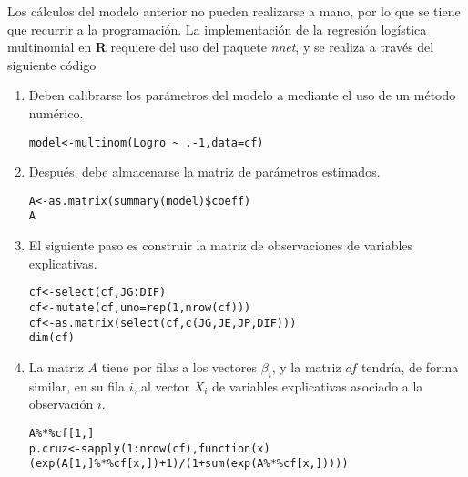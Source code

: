 \documentclass{article}
\theoremstyle{remark}
\begin{document}
Los cálculos del modelo anterior no pueden realizarse a mano, por lo que se tiene que recurrir a la programación. La implementación de la regresión logística multinomial en \textbf{R} requiere del uso del paquete \textit{nnet}, y se realiza a través del siguiente código
\begin{enumerate}
    \item Deben calibrarse los parámetros del modelo a mediante el uso de un método numérico.
    \begin{verbatim}
model<-multinom(Logro ~ .-1,data=cf)
\end{verbatim}
\item Después, debe almacenarse la matriz de parámetros estimados.
\begin{verbatim}
A<-as.matrix(summary(model)$coeff)
A
\end{verbatim}
\item El siguiente paso es construir la matriz de observaciones de variables explicativas.
\begin{verbatim}
cf<-select(cf,JG:DIF)
cf<-mutate(cf,uno=rep(1,nrow(cf)))  
cf<-as.matrix(select(cf,c(JG,JE,JP,DIF)))
dim(cf)
\end{verbatim}
\item La matriz \(A\) tiene por filas a los vectores \(\beta_i\), y la matriz \(cf\) tendría, de forma similar, en su fila \(i\), al vector \(X_i\) de variables explicativas asociado a la observación \(i\).
\begin{verbatim}
A%*%cf[1,]
p.cruz<-sapply(1:nrow(cf),function(x)(exp(A[1,]%*%cf[x,])+1)/(1+sum(exp(A%*%cf[x,]))))
\end{verbatim}
\end{enumerate}
\newpage
\end{document}
